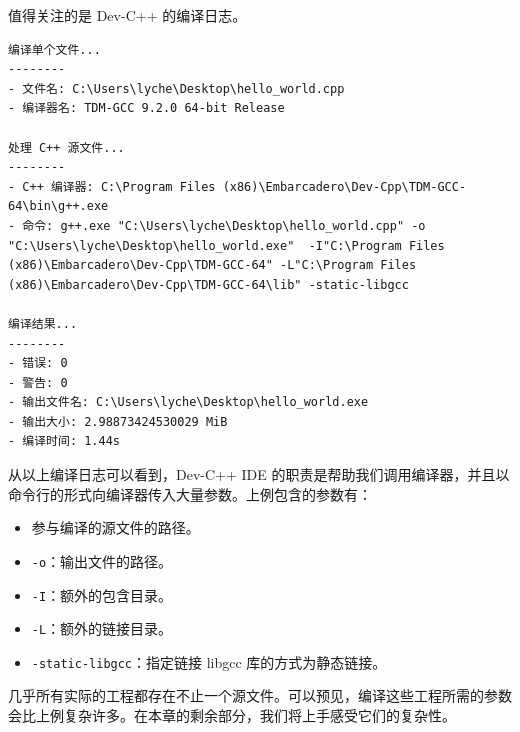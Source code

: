 值得关注的是 Dev-C++ 的编译日志。

\begin{lstlisting}[language={}]
编译单个文件...
--------
- 文件名: C:\Users\lyche\Desktop\hello_world.cpp
- 编译器名: TDM-GCC 9.2.0 64-bit Release

处理 C++ 源文件...
--------
- C++ 编译器: C:\Program Files (x86)\Embarcadero\Dev-Cpp\TDM-GCC-64\bin\g++.exe
- 命令: g++.exe "C:\Users\lyche\Desktop\hello_world.cpp" -o "C:\Users\lyche\Desktop\hello_world.exe"  -I"C:\Program Files (x86)\Embarcadero\Dev-Cpp\TDM-GCC-64" -L"C:\Program Files (x86)\Embarcadero\Dev-Cpp\TDM-GCC-64\lib" -static-libgcc

编译结果...
--------
- 错误: 0
- 警告: 0
- 输出文件名: C:\Users\lyche\Desktop\hello_world.exe
- 输出大小: 2.98873424530029 MiB
- 编译时间: 1.44s
\end{lstlisting}

从以上编译日志可以看到，Dev-C++ IDE 的职责是帮助我们调用编译器，并且以命令行的形式向编译器传入大量参数。上例包含的参数有：

\begin{itemize}
	\item 参与编译的源文件的路径。
	\item \lstinline[language={}]{-o}：输出文件的路径。
	\item \lstinline[language={}]{-I}：额外的包含目录。
	\item \lstinline[language={}]{-L}：额外的链接目录。
	\item \lstinline[language={}]{-static-libgcc}：指定链接 libgcc 库的方式为静态链接。
\end{itemize}

几乎所有实际的工程都存在不止一个源文件。可以预见，编译这些工程所需的参数会比上例复杂许多。在本章的剩余部分，我们将上手感受它们的复杂性。
